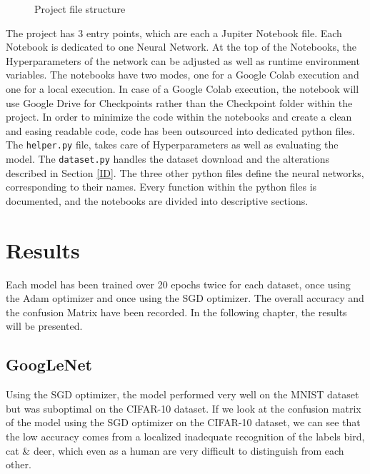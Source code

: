 \documentclass[conference]{IEEEtran}
\begin{document}
\begin{figure}[!htbp]
\caption{Project file structure}
\label{dir: file strucutre}
\end{figure}

The project has 3 entry points, which are each a Jupiter Notebook file. Each Notebook is dedicated to one Neural Network.
At the top of the Notebooks, the Hyperparameters of the network can be adjusted as well as runtime environment variables.
The notebooks have two modes, one for a Google Colab execution and one for a local execution.
In case of a Google Colab execution, the notebook will use Google Drive for Checkpoints rather than the Checkpoint folder within the project.
In order to minimize the code within the notebooks and create a clean and easing readable code, code has been outsourced into dedicated python files.
The \verb|helper.py| file, takes care of Hyperparameters as well as evaluating the model. The \verb|dataset.py| handles the dataset download and the alterations described in Section \ref{ID}.
The three other python files define the neural networks, corresponding to their names. Every function within the python files is documented, and the notebooks are divided into descriptive sections.


\section{Results}\label{C4}
Each model has been trained over 20 epochs twice for each dataset, once using the Adam optimizer and once using the SGD optimizer. 
The overall accuracy and the confusion Matrix have been recorded. In the following chapter, the results will be presented.

\subsection{GoogLeNet}

Using the SGD optimizer, the model performed very well on the MNIST dataset but was suboptimal on the CIFAR-10 dataset. 
If we look at the confusion matrix of the model using the SGD optimizer on the CIFAR-10 dataset, we can see that the low accuracy comes from a localized inadequate recognition of the labels bird, cat \& deer, which even as a human are very difficult to distinguish from each other.
\end{document}
